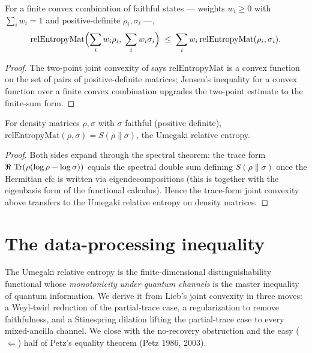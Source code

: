\begin{lemma}\label{relEntropyMat_convex_sum}
  \leanok
  For a finite convex combination of faithful states --- weights \(w_i\ge 0\) with
  \(\sum_i w_i = 1\) and positive-definite \(\rho_i,\sigma_i\) ---,
  \[
    \mathrm{relEntropyMat}\Bigl(\sum_i w_i\rho_i,\;\sum_i w_i\sigma_i\Bigr)
      \;\le\; \sum_i w_i\,\mathrm{relEntropyMat}(\rho_i,\sigma_i).
  \]
\end{lemma}
\begin{proof}\leanok
  The two-point joint convexity of  says
  \(\mathrm{relEntropyMat}\) is a convex function on the set of pairs of positive-definite
  matrices; Jensen's inequality for a convex function over a finite convex combination upgrades
  the two-point estimate to the finite-sum form.
\end{proof}

\begin{theorem}\label{relEntropyMat_eq_relEntropy}
  \leanok
  For density matrices \(\rho,\sigma\) with \(\sigma\) faithful (positive definite),
  \(\mathrm{relEntropyMat}(\rho,\sigma) = S(\rho\|\sigma)\), the Umegaki relative entropy.
\end{theorem}
\begin{proof}\leanok
  Both sides expand through the spectral theorem: the trace form
  \(\Re\,\operatorname{Tr}(\rho(\log\rho - \log\sigma))\) equals the spectral double sum defining
  \(S(\rho\|\sigma)\) once the Hermitian cfc is written via eigendecompositions
  (this is  together with the eigenbasis form of the functional
  calculus). Hence the trace-form joint convexity above transfers to the Umegaki relative entropy
  on density matrices.
\end{proof}

\section{The data-processing inequality}
\label{sec:dpi}

The Umegaki relative entropy is the finite-dimensional distinguishability functional whose
\emph{monotonicity under quantum channels} is the master inequality of quantum information. We
derive it from Lieb's joint convexity in three moves: a Weyl-twirl reduction of the partial-trace
case, a regularization to remove faithfulness, and a Stinespring dilation lifting the
partial-trace case to every mixed-ancilla channel. We close with the no-recovery obstruction and
the easy (\(\Leftarrow\)) half of Petz's equality theorem (Petz 1986, 2003).


